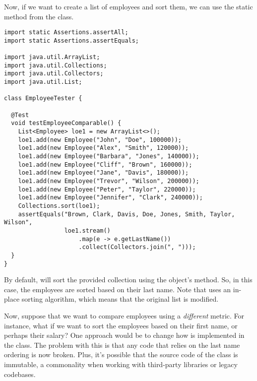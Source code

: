 Now, if we want to create a list of employees and sort them, we can use the static  method from the  class. 

\enlargethispage{2\baselineskip}
\begin{lstlisting}[language=MyJava]
import static Assertions.assertAll;
import static Assertions.assertEquals;

import java.util.ArrayList;
import java.util.Collections;
import java.util.Collectors;
import java.util.List;

class EmployeeTester {

  @Test
  void testEmployeeComparable() {
    List<Employee> loe1 = new ArrayList<>();
    loe1.add(new Employee("John", "Doe", 100000));
    loe1.add(new Employee("Alex", "Smith", 120000));
    loe1.add(new Employee("Barbara", "Jones", 140000));
    loe1.add(new Employee("Cliff", "Brown", 160000));
    loe1.add(new Employee("Jane", "Davis", 180000));
    loe1.add(new Employee("Trevor", "Wilson", 200000));
    loe1.add(new Employee("Peter", "Taylor", 220000));
    loe1.add(new Employee("Jennifer", "Clark", 240000));
    Collections.sort(loe1);
    assertEquals("Brown, Clark, Davis, Doe, Jones, Smith, Taylor, Wilson",
                 loe1.stream()
                     .map(e -> e.getLastName())
                     .collect(Collectors.join(", ")));
  }
}
\end{lstlisting}

By default,  will sort the provided collection using the object's  method. So, in this case, the employees are sorted based on their last name. Note that  uses an in-place sorting algorithm, which means that the original list is modified.

Now, suppose that we want to compare employees using a \emph{different} metric. 
For instance, what if we want to sort the employees based on their first name, or perhaps their salary? 
One approach would be to change how  is implemented in the  class. 
The problem with this is that any code that relies on the last name ordering is now broken. 
Plus, it's possible that the source code of the  class is immutable, a commonality when working with third-party libraries or legacy codebases.

